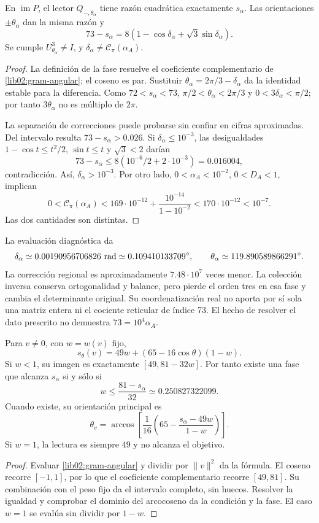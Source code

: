 \begin{corollary}
\label{lib02:fase-alpha}
En \(\operatorname{im}P\), el lector
\(Q_{-,\theta_\alpha}\) tiene razón cuadrática exactamente
\(s_\alpha\). Las orientaciones \(\pm\theta_\alpha\) dan la
misma razón y
\[
 73-s_\alpha
 =8(1-\cos\delta_\alpha+\sqrt3\sin\delta_\alpha).
\]
Se cumple \(U_{\theta_\alpha}^3\ne I\), y
\(\delta_\alpha\ne\mathcal C_\pi(\alpha_A)\).
\end{corollary}
\begin{proof}
La definición de la fase resuelve el coeficiente complementario de
\eqref{lib02:gram-angular}; el coseno es par. Sustituir
\(\theta_\alpha=2\pi/3-\delta_\alpha\) da la identidad estable
para la diferencia. Como \(72<s_\alpha<73\),
\(\pi/2<\theta_\alpha<2\pi/3\) y
\(0<3\delta_\alpha<\pi/2\); por tanto \(3\theta_\alpha\)
no es múltiplo de \(2\pi\).

La separación de correcciones puede probarse sin confiar en cifras
aproximadas. Del intervalo resulta \(73-s_\alpha>0.026\).
Si \(\delta_\alpha\leq10^{-3}\), las desigualdades
\(1-\cos t\leq t^2/2\), \(\sin t\leq t\) y
\(\sqrt3<2\) darían
\[
 73-s_\alpha\leq8(10^{-6}/2+2\cdot10^{-3})=0.016004,
\]
contradicción. Así, \(\delta_\alpha>10^{-3}\). Por otro lado,
\(0<\alpha_A<10^{-2}\), \(0<D_A<1\), implican
\[
 0<\mathcal C_\pi(\alpha_A)
 <169\cdot10^{-12}+\frac{10^{-14}}{1-10^{-2}}
 <170\cdot10^{-12}<10^{-7}.
\]
Las dos cantidades son distintas.
\end{proof}

La evaluación diagnóstica da
\[
 \delta_\alpha\simeq0.00190956706826\ {\rm rad}
 \simeq0.109410133709^\circ,\qquad
 \theta_\alpha\simeq119.890589866291^\circ.
\]
La corrección regional es aproximadamente \(7.48\cdot10^7\) veces
menor. La colección inversa conserva ortogonalidad y balance, pero pierde
el orden tres en esa fase y cambia el determinante original. Su coordenatización
real no aporta por sí sola una matriz entera ni el cociente reticular de
índice 73. El hecho de resolver el dato prescrito no demuestra
\(73=10^4\alpha_A\).

\begin{proposition}
\label{lib02:alcanzabilidad}
Para \(v\ne0\), con \(w=w(v)\) fijo,
\[
 s_\theta(v)=49w+(65-16\cos\theta)(1-w).
\]
Si \(w<1\), su imagen es exactamente
\([49,81-32w]\). Por tanto existe una fase que alcanza
\(s_\alpha\) si y sólo si
\[
 w\leq\frac{81-s_\alpha}{32}\simeq0.250827322099.
\]
Cuando existe, su orientación principal es
\[
 \theta_v=\arccos\left[
 \frac1{16}\left(65-\frac{s_\alpha-49w}{1-w}\right)\right].
\]
Si \(w=1\), la lectura es siempre 49 y no alcanza el objetivo.
\end{proposition}
\begin{proof}
Evaluar \eqref{lib02:gram-angular} y dividir por \(\|v\|^2\)
da la fórmula. El coseno recorre \([-1,1]\), por lo que el
coeficiente complementario recorre \([49,81]\). Su combinación con
el peso fijo da el intervalo completo, sin huecos. Resolver la igualdad
y comprobar el dominio del arcocoseno da la condición y la fase.
El caso \(w=1\) se evalúa sin dividir por \(1-w\).
\end{proof}

